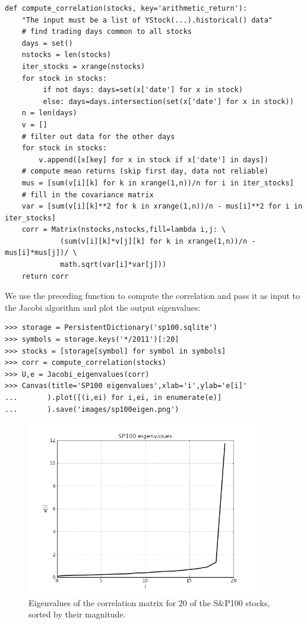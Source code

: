 \documentclass[justified,sixbynine]{tufte-book}
\def\ft{\small\tt}
\theoremstyle{plain}%
\theoremstyle{definition}
\theoremstyle{remark}
\begin{document}
\begin{fullwidth}
\begin{lstlisting}[caption={in file: {\ft nlib.py}}]
def compute_correlation(stocks, key='arithmetic_return'):
    "The input must be a list of YStock(...).historical() data"
    # find trading days common to all stocks
    days = set()
    nstocks = len(stocks)
    iter_stocks = xrange(nstocks)
    for stock in stocks:
         if not days: days=set(x['date'] for x in stock)
         else: days=days.intersection(set(x['date'] for x in stock))
    n = len(days)
    v = []
    # filter out data for the other days
    for stock in stocks:
        v.append([x[key] for x in stock if x['date'] in days])
    # compute mean returns (skip first day, data not reliable)
    mus = [sum(v[i][k] for k in xrange(1,n))/n for i in iter_stocks]
    # fill in the covariance matrix
    var = [sum(v[i][k]**2 for k in xrange(1,n))/n - mus[i]**2 for i in iter_stocks]
    corr = Matrix(nstocks,nstocks,fill=lambda i,j: \
             (sum(v[i][k]*v[j][k] for k in xrange(1,n))/n - mus[i]*mus[j])/ \
             math.sqrt(var[i]*var[j]))
    return corr
\end{lstlisting}

We use the preceding function to compute the correlation and pass it as input to the Jacobi algorithm and plot the output eigenvalues:

\begin{lstlisting}[caption={in file: {\ft nlib.py}}]
>>> storage = PersistentDictionary('sp100.sqlite')
>>> symbols = storage.keys('*/2011')[:20]
>>> stocks = [storage[symbol] for symbol in symbols]
>>> corr = compute_correlation(stocks)
>>> U,e = Jacobi_eigenvalues(corr)
>>> Canvas(title='SP100 eigenvalues',xlab='i',ylab='e[i]'
...       ).plot([(i,ei) for i,ei, in enumerate(e)]
...       ).save('images/sp100eigen.png')
\end{lstlisting}

\begin{figure}[ht]
\centering\includegraphics[width=4in]{images/sp100eigen.png}
\caption{Eigenvalues of the correlation matrix for 20 of the S\&P100 stocks, sorted by their magnitude.}
\end{figure}


\end{fullwidth}
\end{document}
